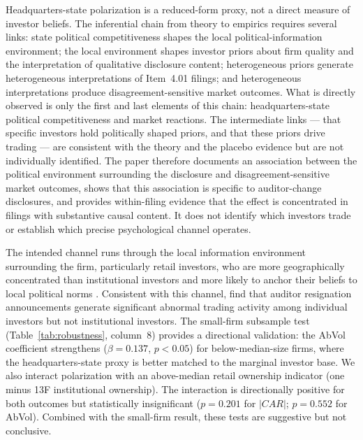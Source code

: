 \documentclass[12pt]{article}
\begin{document}
Headquarters-state polarization is a reduced-form proxy, not a direct
measure of investor beliefs. The inferential chain from theory to
empirics requires several links: state political competitiveness shapes
the local political-information environment; the local environment
shapes investor priors about firm quality and the interpretation of
qualitative disclosure content; heterogeneous priors generate
heterogeneous interpretations of Item~4.01 filings; and heterogeneous
interpretations produce disagreement-sensitive market outcomes. What is
directly observed is only the first and last elements of this chain:
headquarters-state political competitiveness and market reactions. The
intermediate links --- that specific investors hold politically shaped
priors, and that these priors drive trading --- are consistent with the
theory and the placebo evidence but are not individually identified.
The paper therefore documents an association between the political
environment surrounding the disclosure and disagreement-sensitive
market outcomes, shows that this association is specific to
auditor-change disclosures, and provides within-filing evidence that
the effect is concentrated in filings with substantive causal content.
It does not identify which investors trade or establish which precise
psychological channel operates.

The intended channel runs through the local information environment
surrounding the firm, particularly retail investors, who are more
geographically concentrated than institutional investors and more likely
to anchor their beliefs to local political norms \citep{coval1999}.
Consistent with this channel, \citet{boone2001} find that auditor
resignation announcements generate significant abnormal trading activity
among individual investors but not institutional investors. The
small-firm subsample test (Table~\ref{tab:robustness}, column~8)
provides a directional validation: the AbVol coefficient strengthens
($\beta = 0.137$, $p < 0.05$) for below-median-size firms, where the
headquarters-state proxy is better matched to the marginal investor
base. We also interact polarization with an above-median retail
ownership indicator (one minus 13F institutional ownership). The
interaction is directionally positive for both outcomes but
statistically insignificant ($p = 0.201$ for $|CAR|$; $p = 0.552$ for
AbVol). Combined with the small-firm result, these tests are suggestive
but not conclusive.
\end{document}

